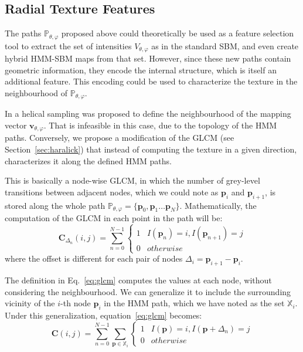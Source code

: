 \subsection{Radial Texture Features}\label{sec:rtextfeat}
The paths $\mathbb{P}_{\theta,\varphi}$ proposed above could theoretically be used as a feature selection tool to extract the set of intensities $V_{\theta,\varphi}$ as in the standard \ac{SBM}, and even create hybrid \ac{HMM}-\ac{SBM} maps from that set. However, since these new paths contain geometric information, they encode the internal structure, which is itself an additional feature. This encoding could be used to characterize the texture in the neighbourhood of $\mathbb{P}_{\theta,\varphi}$. 

In \cite{Martinez-MurciaVRLBP} a helical sampling was proposed to define the neighbourhood of the mapping vector $\mathbf{v}_{\theta,\varphi}$. That is infeasible in this case, due to the topology of the \ac{HMM} paths. Conversely, we propose a modification of the \ac{GLCM} (see Section~\ref{sec:haralick}) that instead of computing the texture in a given direction, characterizes it along the defined \ac{HMM} paths. 

This is basically a node-wise \ac{GLCM}, in which the number of grey-level transitions between adjacent nodes, which we could note as $\mathbf{p}_i$ and $\mathbf{p}_{i+1}$, is stored along the whole path $\mathbb{P}_{\theta,\varphi} = \{\mathbf{p}_0, \mathbf{p}_1 \dots \mathbf{p}_N\}$. Mathematically, the computation of the GLCM in each point in the path will be: 
\begin{equation}\label{eq:glcm}
\mathbf{C}_{\Delta_n}(i,j) = \sum_{n=0}^{N-1}
\begin{cases}
1 & I(\mathbf{p}_n) = i, I(\mathbf{p}_{n+1})=j\\
0 & otherwise
\end{cases}
\end{equation}
where the offset is different for each pair of nodes $\Delta_i=\mathbf{p}_{i+1}-\mathbf{p}_i$. 

The definition in Eq.~\ref{eq:glcm} computes the values at each node, without considering the neighbourhood. We can generalize it to include the surrounding vicinity of the $i$-th node $\mathbf{p}_i$ in the \ac{HMM} path, which we have noted as the set $\mathbb{X}_i$. Under this generalization, equation~\ref{eq:glcm} becomes: 
\begin{equation}\label{eq:glcmGen}
\mathbf{C}(i,j) = \sum_{n=0}^{N-1} \sum_{\mathbf{p} \in \mathbb{X}_i}
\begin{cases}
1 & I(\mathbf{p}) = i, I(\mathbf{p}+\Delta_n)=j\\
0 & otherwise
\end{cases}
\end{equation}

